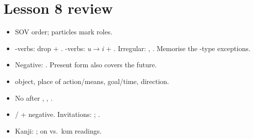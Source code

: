 \section*{Lesson 8 review}
\begin{itemize}
  \item SOV order; particles mark roles.
  \item {}-verbs: drop  + . -verbs: \emph{u}$\to$\emph{i} +
        . Irregular: , . Memorise the -type
        exceptions.
  \item Negative: . Present form also covers the future.
  \item {} object,  place of action/means,  goal/time, 
        direction.
  \item No  after , , .
  \item {}/ + negative. Invitations: ;
        .
  \item Kanji: ; on vs.\ kun readings.
\end{itemize}
